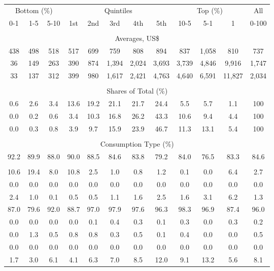 \begin{tabular}{c c c| c c c c c| c c c| c}
\toprule
\multicolumn{3}{c|}{Bottom (\%)} & \multicolumn{5}{c|}{Quintiles} & \multicolumn{3}{c|}{Top (\%)} & All  \\
0-1 & 1-5 & 5-10 &  1st & 2nd & 3rd & 4th & 5th & 10-5 & 5-1 & 1 & 0-100 \\
\midrule \\
\multicolumn{12}{c}{Averages, US\$} \\
\midrule
438  & 498  & 518  & 517  & 699  & 759  & 808  & 894  & 837  & 1,058  & 810  & 737 \\
36 & 149 & 263 & 390 & 874 & 1,394 & 2,024 & 3,693 & 3,739 & 4,846 & 9,916 & 1,747 \\
33 & 137 & 312 & 399 & 980 & 1,617 & 2,421 & 4,763 & 4,640 & 6,591 & 11,827 & 2,034 \\
\midrule \\
\multicolumn{12}{c}{Shares of Total (\%)} \\
\midrule
0.6   & 2.6   & 3.4   & 13.6   & 19.2   & 21.1   & 21.7   & 24.4   & 5.5   & 5.7   & 1.1   & 100 \\
0.0  & 0.2  & 0.6  & 3.4  & 10.3  & 16.8  & 26.2  & 43.3  & 10.6  & 9.4  & 4.4  & 100 \\
0.0  & 0.3  & 0.8  & 3.9  & 9.7  & 15.9  & 23.9  & 46.7  & 11.3  & 13.1  & 5.4  & 100 \\
\midrule \\
\multicolumn{12}{c}{Consumption Type (\%)}  \\
\midrule
92.2 & 89.9 & 88.0 & 90.0 & 88.5 & 84.6 & 83.8 & 79.2 & 84.0 & 76.5 & 83.3 & 84.6 \\
 & & & & & & & & & & &  \\
10.6 & 19.4 & 8.0 & 10.8 & 2.5 & 1.0 & 0.8 & 1.2 & 0.1 & 0.0 & 6.4 & 2.7 \\
0.0 & 0.0 & 0.0 & 0.0 & 0.0 & 0.0 & 0.0 & 0.0 & 0.0 & 0.0 & 0.0 & 0.0 \\
2.4 & 1.0 & 0.1 & 0.5 & 0.5 & 1.1 & 1.6 & 2.5 & 1.6 & 3.1 & 6.2 & 1.3 \\
87.0 & 79.6 & 92.0 & 88.7 & 97.0 & 97.9 & 97.6 & 96.3 & 98.3 & 96.9 & 87.4 & 96.0 \\
0.0 & 0.0 & 0.0 & 0.0 & 0.1 & 0.4 & 0.3 & 0.1 & 0.3 & 0.0 & 0.3 & 0.2 \\
0.0 & 1.3 & 0.5 & 0.8 & 0.8 & 0.3 & 0.5 & 0.1 & 0.4 & 0.0 & 0.0 & 0.5 \\
0.0 & 0.0 & 0.0 & 0.0 & 0.0 & 0.0 & 0.0 & 0.0 & 0.0 & 0.0 & 0.0 & 0.0 \\
1.7 & 3.0 & 6.1 & 4.1 & 6.3 & 7.0 & 8.5 & 12.0 & 9.1 & 13.2 & 5.6 & 8.1 \\

\end{tabular}

